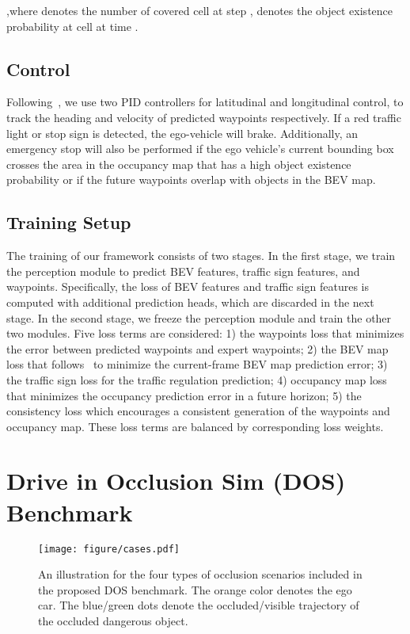 \documentclass[10pt,twocolumn,letterpaper]{article}
\begin{document}
,where  denotes the number of covered cell at step ,  denotes the object existence probability at cell  at time .


\subsection{Control}
\label{sec:control}
Following~\cite{chen2020learning}, we use two PID controllers for latitudinal and longitudinal control, to track the heading and velocity of predicted waypoints respectively. If a red traffic light or stop sign is detected, the ego-vehicle will brake. Additionally, an emergency stop will also be performed if the ego vehicle's current bounding box crosses the area in the occupancy map that has a high object existence probability or if the future waypoints overlap with objects in the BEV map.



\subsection{Training Setup}
\label{sec:training setup}
The training of our framework consists of two stages. In the first stage, we train the perception module to predict BEV features, traffic sign features, and waypoints. Specifically, the loss of BEV features and traffic sign features is computed with additional prediction heads, which are discarded in the next stage. In the second stage, we freeze the perception module and train the other two modules. Five loss terms are considered: 1) the waypoints loss  that minimizes the error between predicted waypoints and expert waypoints; 2) the BEV map loss  that follows~\cite{yin2021center,chen2022learning} to minimize the current-frame BEV map prediction error; 3) the traffic sign loss  for the traffic regulation prediction; 4) occupancy map loss  that minimizes the occupancy prediction error in a future horizon; 5) the consistency loss  which encourages a consistent generation of the waypoints and occupancy map. These loss terms are balanced by corresponding loss weights.



\section{Drive in Occlusion Sim (DOS) Benchmark}
\label{sec:dos}
\begin{figure}[t]
    \centering
    \texttt{[image: figure/cases.pdf]}
    \vspace{-1em}
    \caption{An illustration for the four types of occlusion scenarios included in the proposed DOS benchmark. The orange color denotes the ego car. The blue/green dots denote the occluded/visible trajectory of the occluded dangerous object.}
    \label{fig:scenarios}
    \vspace{-1em}
\end{figure}
\end{document}
